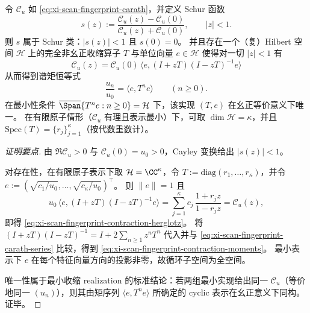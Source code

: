 \begin{proposition}\label{prop:xi-scan-fingerprint-minimal-contraction-realization}
令 \(\mathscr{C}_u\) 如 \eqref{eq:xi-scan-fingerprint-carath}，并定义 Schur 函数
\[
s(z):=\frac{\mathscr{C}_u(z)-\mathscr{C}_u(0)}{\mathscr{C}_u(z)+\mathscr{C}_u(0)},
\qquad |z|<1.
\]
则 \(s\) 属于 Schur 类：\(|s(z)|<1\) 且 \(s(0)=0\)。
并且存在一个（复）Hilbert 空间 \(\mathcal{H}\) 上的完全非幺正收缩算子 \(T\) 与单位向量 \(e\in\mathcal{H}\) 使得对一切 \(|z|<1\) 有
\begin{equation}\label{eq:xi-scan-fingerprint-contraction-herglotz}
\boxed{\;
\mathscr{C}_u(z)=\mathscr{C}_u(0)\,\langle e,(I+zT)(I-zT)^{-1}e\rangle\;}
\end{equation}
从而得到谱矩恒等式
\begin{equation}\label{eq:xi-scan-fingerprint-contraction-moments}
\boxed{\;
\frac{u_n}{u_0}=\langle e,T^{n}e\rangle\qquad(n\ge 0).\;}
\end{equation}
在最小性条件
\(
\overline{\Span}\{T^n e:n\ge 0\}=\mathcal{H}
\)
下，该实现 \((T,e)\) 在幺正等价意义下唯一。
在有限原子情形（\(\mathscr{C}_u\) 有理且表示最小）下，可取 \(\dim\mathcal{H}=\kappa\)，并且 \(\mathrm{Spec}(T)=\{r_j\}_{j=1}^{\kappa}\)（按代数重数计）。
\end{proposition}
\begin{proof}[证明要点]
由 \(\Re\mathscr{C}_u>0\) 与 \(\mathscr{C}_u(0)=u_0>0\)，Cayley 变换给出 \(|s(z)|<1\)。
\par
对存在性，在有限原子表示下取 \(\mathcal{H}=\CC^\kappa\)，令 \(T:=\mathrm{diag}(r_1,\dots,r_\kappa)\)，并令
\(
e:=(\sqrt{c_1/u_0},\dots,\sqrt{c_\kappa/u_0})^\top
\)。
则 \(\|e\|=1\) 且
\[
u_0\,\langle e,(I+zT)(I-zT)^{-1}e\rangle
=\sum_{j=1}^{\kappa}c_j\,\frac{1+r_j z}{1-r_j z}
=\mathscr{C}_u(z),
\]
即得 \eqref{eq:xi-scan-fingerprint-contraction-herglotz}。
将 \((I+zT)(I-zT)^{-1}=I+2\sum_{n\ge 1}z^nT^n\) 代入并与 \eqref{eq:xi-scan-fingerprint-carath-series} 比较，得到 \eqref{eq:xi-scan-fingerprint-contraction-moments}。
最小表示下 \(e\) 在每个特征向量方向的投影非零，故循环子空间为全空间。
\par
唯一性属于最小收缩 realization 的标准结论：若两组最小实现给出同一 \(\mathscr{C}_u\)（等价地同一 \((u_n)\)），则其由矩序列 \(\langle e,T^n e\rangle\) 所确定的 cyclic 表示在幺正意义下同构。证毕。
\end{proof}

